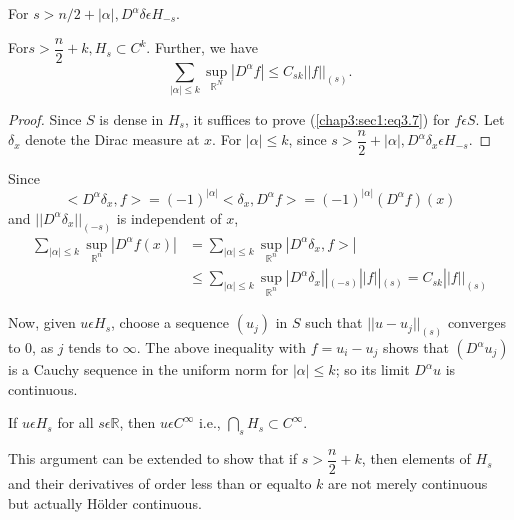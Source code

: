 \setcounter{coro}{4}
\begin{coro}\label{chap3:sec1:coro3.5}%
  For $s > n/2 + | \alpha |, D^{\alpha} \delta \epsilon H_{-s}$.
\end{coro}

\setcounter{thm}{5}
\begin{thm}\label{chap3:sec1:thm3.6} %
  For\pageoriginale $s > \dfrac{n}{2} + k, H_s
  \subset C^k$. Further, we have 
\begin{equation}
  \sum_{| \alpha | \leq k} \sup\limits_{\mathbb{R}^N} | D^\alpha f |
  \leq C_{sk} || f ||_{(s)}. \tag{3.7}\label{chap3:sec1:eq3.7} 
\end{equation}
\end{thm}

\begin{proof}
  Since $S$ is dense in $H_s$, it suffices to prove (\ref{chap3:sec1:eq3.7}) for $f
  \epsilon S$. Let $\delta_x$ denote the Dirac measure at $x$. For $|
  \alpha | \leq k$, since $s > \dfrac{n}{2} + | \alpha |, D^\alpha \delta_x
  \epsilon H_{-s}$. 
\end{proof}

Since 
$$
< D^\alpha \delta_x, f > = (-1)^{| \alpha |}  < \delta_x, D^\alpha f >
= (-1)^{| \alpha |} (D^\alpha f) (x) 
$$
and $|| D^\alpha \delta_x ||_{(-s)}$ is independent of $x$,
\begin{align*}
  \sum_{| \alpha | \leq k} \sup\limits_{\mathbb{R}^n} | D^\alpha f (x) |
  &= \sum_{| \alpha | \leq k} \sup\limits_{\mathbb{R}^n} | D^\alpha
  \delta_x, f >| \\ 
  &\leq \sum_{| \alpha | \leq k} \sup\limits_{\mathbb{R}^n} | D^\alpha
  \delta_x ||_{(-s)} || f ||_{(s)} = C_{sk} || f ||_{(s)} 
\end{align*}

Now, given $u \epsilon H_s$, choose a sequence $(u_j)$ in $S$ such
that $|| u - u_j ||_{(s)}$ converges to 0, as $j$ tends to
$\infty$. The above inequality with $f = u_i - u_j$ shows that
$(D^\alpha u_j)$ is a Cauchy sequence in the uniform norm for $|
\alpha | \leq k$; so its limit $D^\alpha u$ is continuous. 

\setcounter{coro}{7}
\begin{coro}\label{chap3:sec1:coro3.8}%
  If $u \epsilon H_s$ for all $s \epsilon \mathbb{R}$, then
  $u \epsilon C^\infty $ i.e., $\bigcap\limits_s H_s \subset
  C^\infty$. 
\end{coro}

This argument can be extended to show that if $s > \dfrac{n}{2} + k$, then
elements of $H_s$ and their derivatives of order less than or
equal\pageoriginale to 
$k$ are not merely continuous but actually H\"{o}lder continuous. 

